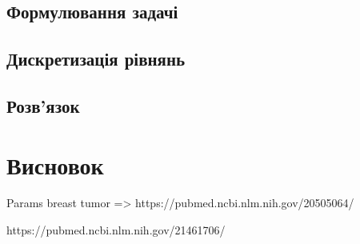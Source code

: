 \subsection{Формулювання задачі}

\subsection{Дискретизація рівнянь}

\subsection{Розв'язок}

\section{Висновок}


Params breast tumor => https://pubmed.ncbi.nlm.nih.gov/20505064/


https://pubmed.ncbi.nlm.nih.gov/21461706/ 


